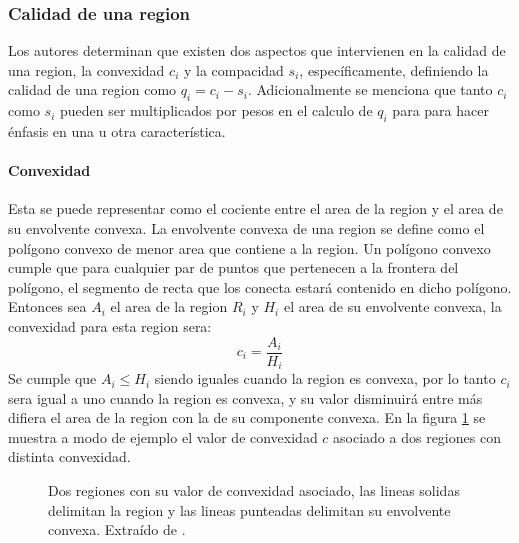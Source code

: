 \subsubsection{Calidad de una region}
Los autores determinan que existen dos aspectos que intervienen en la calidad de una region, la convexidad $c_i$ y la compacidad $s_i$, específicamente, definiendo la calidad de una region como $q_i = c_i - s_i$. Adicionalmente se menciona que tanto $c_i$ como $s_i$ pueden ser multiplicados por pesos en el calculo de $q_i$ para  para hacer énfasis en una u otra característica.

\paragraph{Convexidad}
Esta se puede representar como el cociente entre el area de la region y el area de su envolvente convexa. La envolvente convexa de una region se define como el polígono convexo de menor area que contiene a la region. Un polígono convexo cumple que para cualquier par de puntos que pertenecen a la frontera del polígono, el segmento de recta que los conecta estará contenido en dicho polígono. Entonces sea $A_i$ el area de la region $R_i$ y $H_i$ el area de su envolvente convexa, la convexidad para esta region sera:
\begin{equation}
  c_i=\frac{A_i}{H_i}
\end{equation}
Se cumple que $A_i \leq H_i$ siendo iguales cuando la region es convexa, por lo tanto $c_i$ sera igual a uno cuando la region es convexa, y su valor disminuirá entre más difiera el area de la region con la de su componente convexa. En la figura \ref{fig:ejemplConvexidad} se muestra a modo de ejemplo el valor de convexidad $c$ asociado a dos regiones con distinta convexidad.
\begin{figure}[H]
  \centering
  \hspace{2cm}
  \qquad
  \caption{Dos regiones con su valor de convexidad asociado, las lineas solidas delimitan la region y las lineas punteadas delimitan su envolvente convexa. Extraído de \cite{Liu2015}.}\label{fig:ejemplConvexidad}
\end{figure}

